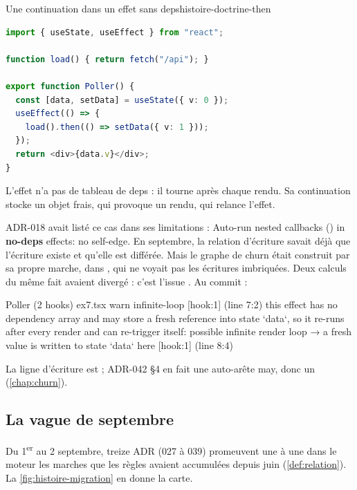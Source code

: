 \begin{exemple}{Une continuation  dans un effet sans deps}{histoire-doctrine-then}
\begin{lstlisting}[language=TypeScript,caption={\file{/tmp/ch26/ex7.tsx}}]
import { useState, useEffect } from "react";

function load() { return fetch("/api"); }

export function Poller() {
  const [data, setData] = useState({ v: 0 });
  useEffect(() => {
    load().then(() => setData({ v: 1 }));
  });
  return <div>{data.v}</div>;
}
\end{lstlisting}
L'effet n'a pas de tableau de deps : il tourne après chaque rendu. Sa continuation stocke un objet frais, qui provoque un rendu, qui relance l'effet.
\end{exemple}

ADR-018 avait listé ce cas dans ses limitations : \og Auto-run nested callbacks () in \textbf{no-deps} effects: no self-edge\fg{}. En septembre, la relation d'écriture  savait déjà que l'écriture existe et qu'elle est différée. Mais le graphe de churn était construit par sa propre marche, dans , qui ne voyait pas les écritures imbriquées. Deux calculs du même fait avaient divergé : c'est l'issue . Au commit  :

\begin{sortie}
  Poller  (2 hooks)  ex7.tsx
    warn   infinite-loop  [hook:1]  (line 7:2)  this effect has no dependency array and may store a fresh reference into state `data`, so it re-runs after every render and can re-trigger itself: possible infinite render loop
       → a fresh value is written to state `data` here [hook:1] (line 8:4)
\end{sortie}

La ligne d'écriture est  ; ADR-042 §4 en fait une auto-arête may, donc un \Warning{} (\cref{chap:churn}).

\subsection{La vague de septembre}

Du 1\textsuperscript{er} au 2 septembre, treize ADR (027 à 039) promeuvent une à une dans le moteur les marches que les règles avaient accumulées depuis juin (\cref{def:relation}). La \cref{fig:histoire-migration} en donne la carte.


